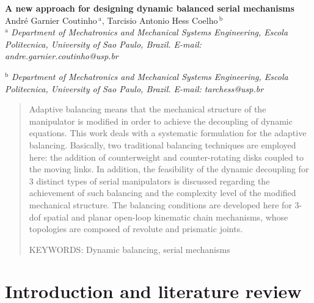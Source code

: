 \documentclass[a4paper,11pt,brazil,fleqn]{article}
\begin{document}

\noindent
{\bf \huge A new approach for designing dynamic balanced serial mechanisms}\\


\noindent
{\Large 		Andr\'e Garnier Coutinho$\,{}^\text{a}$,
			Tarcisio Antonio Hess Coelho$\,{}^\text{b}$
}\\

\noindent
{${}^\text{a}$ \it Department of Mechatronics and Mechanical Systems Engineering, Escola Politecnica, 
University of Sao Paulo, Brazil. E-mail: andre.garnier.coutinho@usp.br}

\noindent
{${}^\text{b}$ \it Department of Mechatronics and Mechanical Systems Engineering, Escola Politecnica, 
University of Sao Paulo, Brazil. E-mail: tarchess@usp.br}

\vspace{24pt}


\begin{abstract}

Adaptive balancing means that the mechanical structure of the manipulator is modified in order to achieve the decoupling of dynamic equations. This work deals with a systematic formulation for the adaptive balancing. Basically, two traditional balancing techniques are employed here: the addition of counterweight and counter-rotating disks coupled to the moving links. In addition, the feasibility of the dynamic decoupling for 3 distinct types of serial manipulators is discussed regarding the achievement of such balancing and the complexity level of the modified mechanical structure. The balancing conditions are developed here for 3-dof spatial and planar open-loop kinematic chain mechanisms, whose topologies are composed of revolute and prismatic joints.

\vspace{10pt}

\noindent
KEYWORDS: {Dynamic balancing, serial mechanisms}
\end{abstract}







\section{Introduction and literature review}\label{S01}
\end{document}
